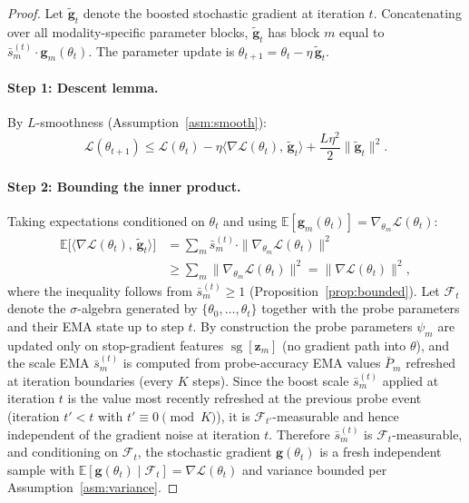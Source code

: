 \documentclass{article}
\newcommand{\loss}{\mathcal{L}}
\newcommand{\sg}{\operatorname{sg}}
\begin{document}
\begin{proof}
Let $\tilde{\mathbf{g}}_t$ denote the boosted stochastic gradient at iteration $t$. Concatenating over all modality-specific parameter blocks, $\tilde{\mathbf{g}}_t$ has block $m$ equal to $\bar{s}_m^{(t)} \cdot \mathbf{g}_m(\theta_t)$. The parameter update is $\theta_{t+1} = \theta_t - \eta\,\tilde{\mathbf{g}}_t$.

\paragraph{Step 1: Descent lemma.}
By $L$-smoothness (Assumption~\ref{asm:smooth}):
%
\begin{equation}
\label{eq:descent}
\loss(\theta_{t+1}) \leq \loss(\theta_t) - \eta \langle \nabla \loss(\theta_t),\, \tilde{\mathbf{g}}_t \rangle + \frac{L\eta^2}{2}\|\tilde{\mathbf{g}}_t\|^2.
\end{equation}

\paragraph{Step 2: Bounding the inner product.}
Taking expectations conditioned on $\theta_t$ and using $\mathbb{E}[\mathbf{g}_m(\theta_t)] = \nabla_{\theta_m} \loss(\theta_t)$:
%
\begin{align}
\mathbb{E}\bigl[\langle \nabla \loss(\theta_t),\, \tilde{\mathbf{g}}_t \rangle\bigr]
&= \sum_m \bar{s}_m^{(t)} \cdot \|\nabla_{\theta_m} \loss(\theta_t)\|^2 \nonumber \\
&\geq \sum_m \|\nabla_{\theta_m} \loss(\theta_t)\|^2 = \|\nabla \loss(\theta_t)\|^2,
\label{eq:inner_bound}
\end{align}
%
where the inequality follows from $\bar{s}_m^{(t)} \geq 1$ (Proposition~\ref{prop:bounded}). Let $\mathcal{F}_t$ denote the $\sigma$-algebra generated by $\{\theta_0, \dots, \theta_t\}$ together with the probe parameters and their EMA state up to step $t$. By construction the probe parameters $\psi_m$ are updated only on stop-gradient features $\sg[\mathbf{z}_m]$ (no gradient path into $\theta$), and the scale EMA $\bar{s}_m^{(t)}$ is computed from probe-accuracy EMA values $\bar{P}_m$ refreshed at iteration boundaries (every $K$ steps). Since the boost scale $\bar{s}_m^{(t)}$ applied at iteration $t$ is the value most recently refreshed at the previous probe event (iteration $t' < t$ with $t' \equiv 0 \pmod K$), it is $\mathcal{F}_{t'}$-measurable and hence independent of the gradient noise at iteration $t$. Therefore $\bar{s}_m^{(t)}$ is $\mathcal{F}_t$-measurable, and conditioning on $\mathcal{F}_t$, the stochastic gradient $\mathbf{g}(\theta_t)$ is a fresh independent sample with $\mathbb{E}[\mathbf{g}(\theta_t) \mid \mathcal{F}_t] = \nabla\loss(\theta_t)$ and variance bounded per Assumption~\ref{asm:variance}.


\end{proof}
\end{document}
